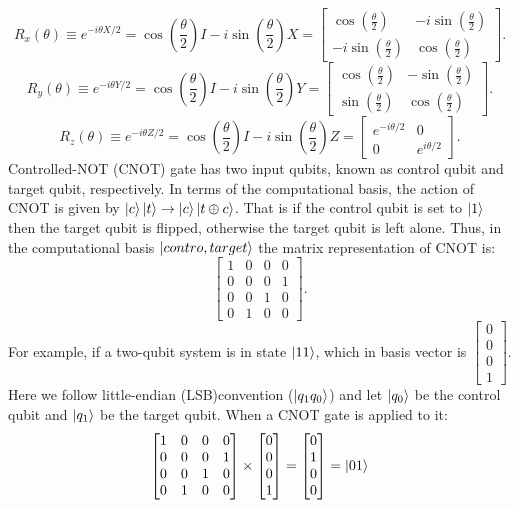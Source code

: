 \documentclass[12pt]{article}
\numberwithin{equation}{section}  %
\theoremstyle{definition}
\theoremstyle{plain}
\theoremstyle{remark}
\begin{document}
\begin{equation}
    R_x(\theta)\equiv e^{-i\theta X/2}=\cos(\frac{\theta}{2})I-i\sin(\frac{\theta}{2})X=\begin{bmatrix}
    \cos(\frac{\theta}{2})&-i\sin(\frac{\theta}{2})\\-i\sin(\frac{\theta}{2})&\cos(\frac{\theta}{2})
\end{bmatrix}.
\end{equation}
\begin{equation}
    R_y(\theta)\equiv e^{-i\theta Y/2}=\cos(\frac{\theta}{2})I-i\sin(\frac{\theta}{2})Y=\begin{bmatrix}
    \cos(\frac{\theta}{2})&-\sin(\frac{\theta}{2})\\ \sin(\frac{\theta}{2})&\cos(\frac{\theta}{2})
\end{bmatrix}.
\end{equation}
\begin{equation}
    R_z(\theta)\equiv e^{-i\theta Z/2}=\cos(\frac{\theta}{2})I-i\sin(\frac{\theta}{2})Z=\begin{bmatrix}
    e^{-i\theta/2}&0\\0&e^{i\theta/2}
\end{bmatrix}.
\end{equation}
Controlled-NOT (CNOT) gate has two input qubits, known as control qubit and target qubit, respectively. In terms of the computational basis, the action of CNOT is given by $\ket{c}\ket{t}\rightarrow\ket{c}\ket{t\oplus c}$. That is if the control qubit is set to $\ket{1}$ then the target qubit is flipped, otherwise the target qubit is left alone. Thus, in the computational basis $\ket{contro,target}$ the matrix representation of CNOT is:
\[\begin{bmatrix}
    1&0&0&0\\0&0&0&1\\0&0&1&0\\0&1&0&0
\end{bmatrix}.\]
For example, if a two-qubit system is in state $\ket{11}$, which in basis vector is $\begin{bmatrix}0\\0\\0\\1\end{bmatrix}$. Here we follow little-endian (LSB)convention ($\ket{q_1q_0}$) and let $\ket{q_0}$ be the control qubit and $\ket{q_1}$ be the target qubit. When a CNOT gate is applied to it:
\[\begin{bmatrix}1&0&0&0\\0&0&0&1\\0&0&1&0\\0&1&0&0\end{bmatrix}\times
\begin{bmatrix}0\\0\\0\\1\end{bmatrix}=\begin{bmatrix}0\\1\\0\\0\end{bmatrix}=\ket{01}\]
\end{document}
